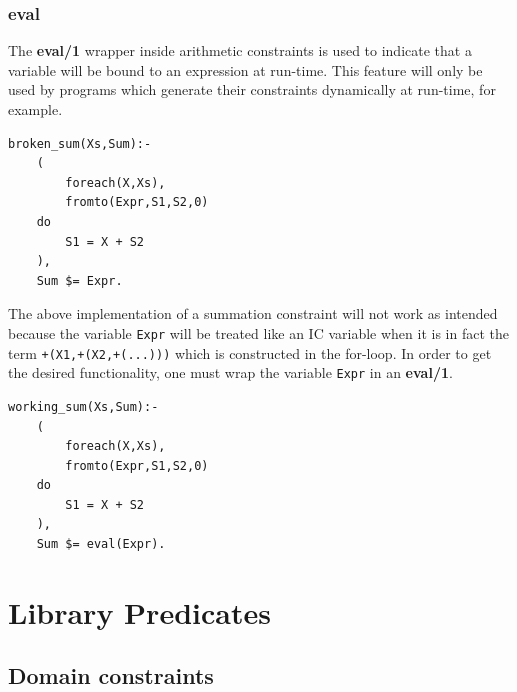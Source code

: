 \subsubsection{{\bf eval}}
\label{sec:eval}
The {\bf eval/1} wrapper inside arithmetic constraints is used to
indicate that a variable will be bound to an expression at run-time.
This feature will only be used by programs which generate their
constraints dynamically at run-time, for example.
\begin{verbatim}
broken_sum(Xs,Sum):-
    (
        foreach(X,Xs),
        fromto(Expr,S1,S2,0)
    do
        S1 = X + S2
    ),
    Sum $= Expr.
\end{verbatim}
The above implementation of a summation constraint will not work as
intended because the variable \texttt{Expr} will be treated like an IC
variable when it is in fact the term \texttt{+(X1,+(X2,+(...)))}
which is constructed in the for-loop.
In order to get the desired functionality, one must wrap the variable
\texttt{Expr} in an {\bf eval/1}.
\begin{verbatim}
working_sum(Xs,Sum):-
    (
        foreach(X,Xs),
        fromto(Expr,S1,S2,0)
    do
        S1 = X + S2
    ),
    Sum $= eval(Expr).
\end{verbatim}

\section{Library Predicates}

\subsection{Domain constraints}

